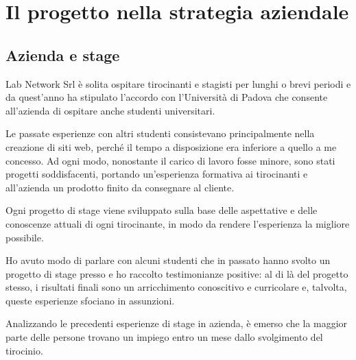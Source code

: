 
\chapter{Il progetto nella strategia aziendale}
\label{cap:processi-metodologie}

\section{Azienda e stage}

Lab Network Srl è solita ospitare tirocinanti e stagisti per lunghi o brevi periodi e da quest'anno ha stipulato l'accordo con l'Università di Padova che consente all'azienda di ospitare anche studenti universitari.

\medskip

Le passate esperienze con altri studenti consistevano principalmente nella creazione di siti web, perché il tempo a disposizione era inferiore a quello a me concesso. Ad ogni modo, nonostante il carico di lavoro fosse minore, sono stati progetti soddisfacenti, portando un'esperienza formativa ai tirocinanti e all'azienda un prodotto finito da consegnare al cliente.

Ogni progetto di stage viene sviluppato sulla base delle aspettative e delle conoscenze attuali di ogni tirocinante, in modo da rendere l'esperienza la migliore possibile.

Ho avuto modo di parlare con alcuni studenti che in passato hanno svolto un progetto di stage presso \lab{} e ho raccolto testimonianze positive: al di là del progetto stesso, i risultati finali sono un arricchimento conoscitivo e curricolare e, talvolta, queste esperienze sfociano in assunzioni.

Analizzando le precedenti esperienze di stage in azienda, è emerso che la maggior parte delle persone trovano un impiego entro un mese dallo svolgimento del tirocinio.

